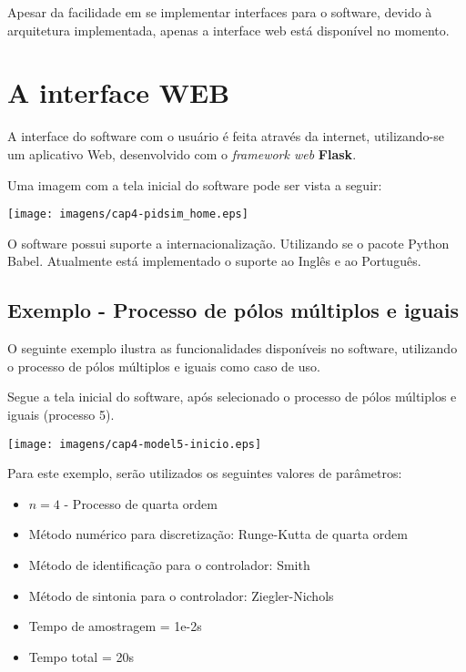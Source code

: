             Apesar da facilidade em se implementar interfaces para o software, devido à arquitetura
            implementada, apenas a interface web está disponível no momento.

\section{A interface WEB}

    A interface do software com o usuário é feita através da internet, utilizando-se um aplicativo Web,
    desenvolvido com o \textit{framework web} \textbf{Flask}.

    Uma imagem com a tela inicial do software pode ser vista a seguir:
    
    \begin{center}
        \texttt{[image: imagens/cap4-pidsim\_home.eps]}
    \end{center}

    O software possui suporte a internacionalização. Utilizando se o pacote Python Babel. Atualmente está
    implementado o suporte ao Inglês e ao Português.
    
    \subsection{Exemplo - Processo de pólos múltiplos e iguais}
    
        O seguinte exemplo ilustra as funcionalidades disponíveis no software,
        utilizando o processo de pólos múltiplos e iguais como caso de uso.
        
        Segue a tela inicial do software, após selecionado o processo de
        pólos múltiplos e iguais (processo 5).
        
        \begin{center}
            \texttt{[image: imagens/cap4-model5-inicio.eps]}
        \end{center}
        
        Para este exemplo, serão utilizados os seguintes valores de parâmetros:
        
        \begin{itemize}
            \item $n = 4$ - Processo de quarta ordem
            \item Método numérico para discretização: Runge-Kutta de quarta ordem
            \item Método de identificação para o controlador: Smith
            \item Método de sintonia para o controlador: Ziegler-Nichols
            \item Tempo de amostragem = 1e-2s
            \item Tempo total = 20s
        \end{itemize}
        
